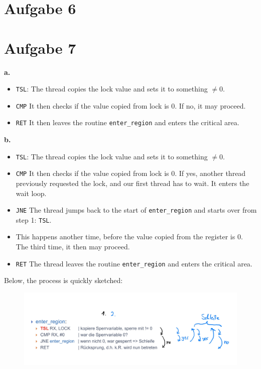 \documentclass{article}
\begin{document}
\section*{Aufgabe 6}
\section*{Aufgabe 7}
\textbf{a.}
\begin{itemize}
    \item \texttt{TSL}: The thread copies the lock value and sets it to something \( 
	    \neq 0  \).
    \item \texttt{CMP} It then checks if the value copied from lock is 0. If no, it
       may proceed.
   \item \texttt{RET} It then leaves the routine \texttt{enter\_region} and
      enters the critical area. 
\end{itemize}
\textbf{b.} 
\begin{itemize}
    \item \texttt{TSL}: The thread copies the lock value and sets it to something \( 
	    \neq 0  \).
    \item \texttt{CMP} It then checks if the value copied from lock is 0.
	If yes, another thread previously requested the lock, and our first
	thread has to wait. It enters the wait loop.
	\item \texttt{JNE} The thread jumps back to the start of
	    \texttt{enter\_region} and starts over from step 1: \texttt{TSL}. 
	\item This happens another time, before the value copied from the
	   register is 0. The third time, it then may proceed. 
       \item \texttt{RET} The thread leaves the routine \texttt{enter\_region}
	   and enters the critical area.
\end{itemize}
Below, the process is quickly sketched:
\begin{figure}[H]
    \centering
    \includegraphics[width=.8\textwidth]{Sketch.jpg}
\end{figure}
\end{document}
